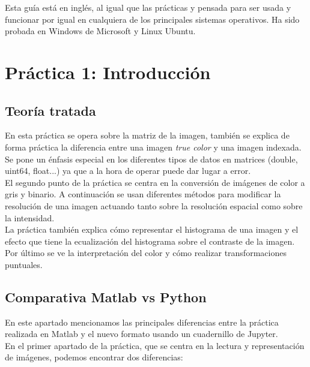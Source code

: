 \documentclass[a4paper,12pt]{report}
\begin{document}
Esta guía está en inglés, al igual que las prácticas y pensada para ser usada y funcionar por igual en cualquiera de los principales sistemas operativos. Ha sido probada en Windows de Microsoft y Linux Ubuntu.\\

\section{ Práctica 1: Introducción}

\subsection{Teoría tratada}

En esta práctica se opera sobre la matriz de la imagen, también se explica de forma práctica la diferencia entre una imagen \emph{true color} y una imagen indexada. Se pone un énfasis especial en los diferentes tipos de datos en matrices (double, uint64, float...) ya que a la hora de operar puede dar lugar a error.\\

El segundo punto de la práctica se centra en la conversión de imágenes de color a gris y binario. A continuación se usan diferentes métodos para modificar la resolución de una imagen actuando tanto sobre la resolución espacial como sobre la intensidad.\\

La práctica también explica cómo representar el histograma de una imagen y el efecto que tiene la ecualización del histograma sobre el contraste de la imagen.\\

Por último se ve la interpretación del color y cómo realizar transformaciones puntuales.\\

\subsection{Comparativa Matlab vs Python}

En este apartado mencionamos las principales diferencias entre la práctica realizada en Matlab y el nuevo formato usando un cuadernillo de Jupyter.\\

En el primer apartado de la práctica, que se centra en la lectura y representación de imágenes, podemos encontrar dos diferencias:\\
\end{document}
